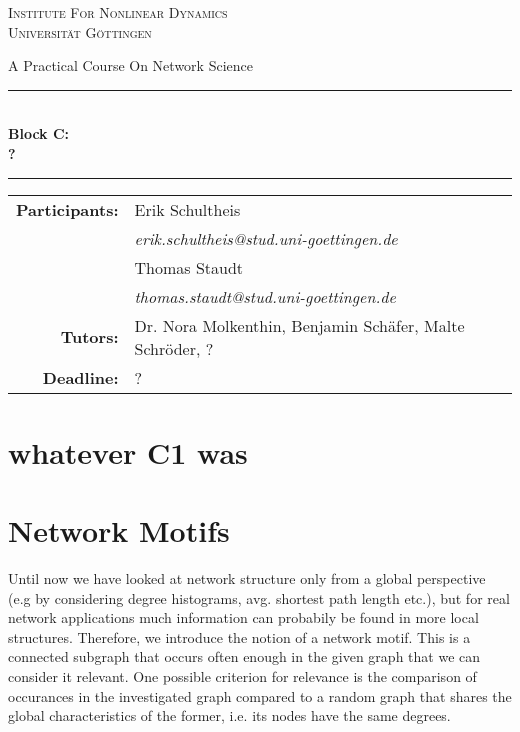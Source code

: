 \documentclass{scrartcl}
\begin{document}
\begin{titlepage}\centering
\textsc{\Large Institute For Nonlinear Dynamics \\[1.5ex] Universität Göttingen}

\vspace*{2cm}
{\huge A Practical Course On Network Science}
\vspace*{2cm}

\rule{\textwidth}{1pt}\\[0.5cm]
{\bfseries \huge Block C: \\[0.5cm] \huge \bfseries ?\\[0.5cm]}
\rule{\textwidth}{1pt}

\vspace*{4cm}

\begin{Large}\begin{tabular}{rl}
        \textbf{Participants:}  & Erik Schultheis                                \\    
                   & \textit{erik.schultheis@stud.uni-goettingen.de}\\[0.5cm]
                   & Thomas Staudt                                  \\
                   & \textit{thomas.staudt@stud.uni-goettingen.de}  \\[1.0cm]

       \textbf{Tutors:}        & Dr. Nora Molkenthin, Benjamin Schäfer, Malte Schröder, ?  \\[1.0cm]
       \textbf{Deadline:}      & ?
\end{tabular}\end{Large}

\vspace*{1.5cm}


\end{titlepage}

\tableofcontents
\clearpage

\section{whatever C1 was}

\section{Network Motifs}
Until now we have looked at network structure only from a global perspective (e.g by considering degree histograms, avg. shortest path length etc.), but for real network applications much information can probabily be found in more local structures. Therefore, we introduce the notion of a network motif. This is a connected subgraph that occurs often enough in the given graph that we can consider it relevant. One possible criterion for relevance is the comparison of occurances in the investigated graph compared to a random graph that shares the global characteristics of the former, i.e. its nodes have the same degrees.
\end{document}

